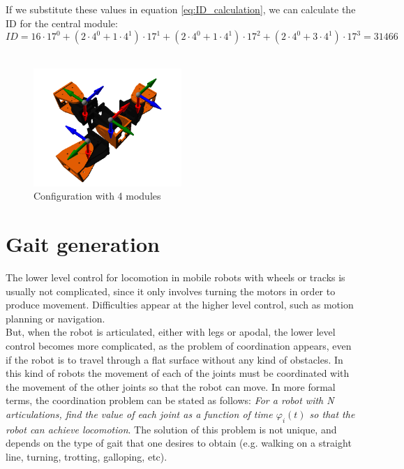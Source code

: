 If we substitute these values in equation \ref{eq:ID_calculation}, we can calculate the ID for the central module:
\[ID =16 \cdot 17^0 +
 ( 2 \cdot 4^0+ 1 \cdot 4^1) \cdot 17^1 +
 ( 2 \cdot 4^0+ 1 \cdot 4^1) \cdot 17^2 +
 ( 2 \cdot 4^0+ 3 \cdot 4^1)  \cdot 17^3 = 31466\]\\
  
\begin{figure}[h]
		\centering
        \includegraphics[width=0.5\textwidth]{images/Conf_example_09-01.png}
        \caption{Configuration with 4 modules}\label{fig:config_example9}
\end{figure}

\section{Gait generation}
\label{gaits}

The lower level control for locomotion in mobile robots with wheels or tracks is usually not complicated, since it only involves turning the motors in order to produce movement. Difficulties appear at the higher level control, such as motion planning or navigation.\\

But, when the robot is articulated, either with legs or apodal, the lower level control becomes more complicated, as the problem of coordination appears, even if the robot is to travel through a flat surface without any kind of obstacles. In this kind of robots the movement of each of the joints must be coordinated with the movement of the other joints so that the robot can move. In more formal terms, the coordination problem can be stated as follows: \emph{For a robot with N articulations, find the value of each joint as a function of time $\varphi_i(t)$ so that the robot can achieve locomotion}. The solution of this problem is not unique, and depends on the type of gait that one desires to obtain (e.g. walking on a straight line, turning, trotting, galloping, etc).\\

